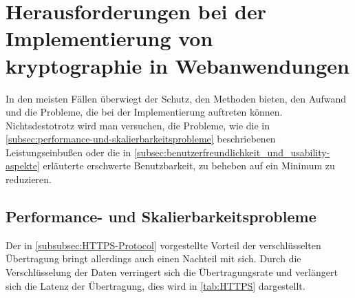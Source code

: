 \newpage
\section[Herausforderungen bei der Implementierung von Kryptographie in Webanwendungen]{Herausforderungen bei der Implementierung von \gls{kryptographie} in Webanwendungen}\label{sec:Herausforderung-bei-der-implementierung-von-kryptographie-in-webanwendungen}
In den meisten Fällen überwiegt der Schutz, den  Methoden bieten, den Aufwand und die Probleme, die bei der Implementierung auftreten können. Nichtsdestotrotz wird man versuchen, die Probleme, wie \zb die in \autoref{subsec:performance-und-skalierbarkeitsprobleme} beschriebenen Leistungseinbußen oder die in \autoref{subsec:benutzerfreundlichkeit_und_usability-aspekte} erläuterte erschwerte Benutzbarkeit, zu beheben \bzw auf ein Minimum zu reduzieren.

\subsection{Performance- und Skalierbarkeitsprobleme}\label{subsec:performance-und-skalierbarkeitsprobleme}
Der in \autoref{subsubsec:HTTPS-Protocol} vorgestellte Vorteil der verschlüsselten Übertragung bringt allerdings auch einen Nachteil mit sich. Durch die Verschlüsselung der Daten verringert sich die Übertragungsrate und verlängert sich die Latenz der Übertragung\autocite[]{goldberg_comparison_nodate}, dies wird in \autoref{tab:HTTPS}\autocite[Übersetzt nach:][]{goldberg_comparison_nodate} dargestellt.

